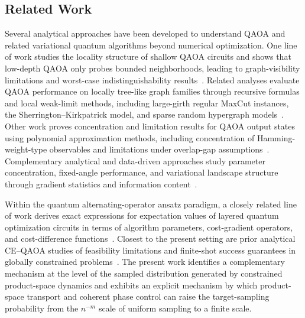 \documentclass[a4paper,onecolumn,11pt,unpublished]{quantumarticle}
\theoremstyle{remark}
\begin{document}
\subsection{Related Work}

Several analytical approaches have been developed to understand QAOA and related variational quantum algorithms beyond numerical optimization. One line of work studies the locality structure of shallow QAOA circuits and shows that low-depth QAOA only probes bounded neighborhoods, leading to graph-visibility limitations and worst-case indistinguishability results~\cite{FarhiGamarnikGutmannTypical,FarhiGamarnikGutmannWorstCase}. Related analyses evaluate QAOA performance on locally tree-like graph families through recursive formulas and local weak-limit methods, including large-girth regular MaxCut instances, the Sherrington--Kirkpatrick model, and sparse random hypergraph models~\cite{BassoFarhiMarwahaVillalongaZhou2022}. Other work proves concentration and limitation results for QAOA output states using polynomial approximation methods, including concentration of Hamming-weight-type observables and limitations under overlap-gap assumptions~\cite{AnshuMetger2023}. Complementary analytical and data-driven approaches study parameter concentration, fixed-angle performance, and variational landscape structure through gradient statistics and information content~\cite{AkshayRabinovichCamposBiamonte2021,WurtzLove2021,PerezSalinasWangBonetMonroig2024}.


Within the quantum alternating-operator ansatz paradigm, a closely related line of work derives exact expressions for expectation values of layered quantum optimization circuits in terms of algorithm parameters, cost-gradient operators, and cost-difference functions~\cite{Hadfield_2022}. Closest to the present setting are prior analytical CE--QAOA studies of
feasibility limitations and finite-shot success guarantees in globally constrained problems~\cite{onahfund,onahfinite}. The present work identifies a complementary mechanism at the level of the sampled distribution generated by constrained product-space dynamics and exhibits an explicit mechanism by which product-space transport and coherent phase control can raise the target-sampling probability from the \(n^{-m}\) scale of uniform sampling to a finite scale. 
\end{document}
